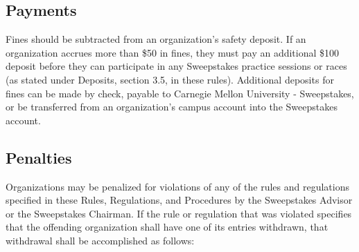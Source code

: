 \subsection{Payments}

	Fines should be subtracted from an organization's safety deposit. If an
	organization accrues more than \$50 in fines, they must pay an additional \$100
	deposit before they can participate in any Sweepstakes practice sessions or
	races (as stated under Deposits, section 3.5, in these rules). Additional
	deposits for fines can be made by check, payable to Carnegie Mellon University
	- Sweepstakes, or be transferred from an organization's campus account into the
	Sweepstakes account.

\subsection{Penalties}

	Organizations may be penalized for violations of any of the rules and
	regulations specified in these Rules, Regulations, and Procedures by the
	Sweepstakes Advisor or the Sweepstakes Chairman. If the rule or regulation that
	was violated specifies that the offending organization shall have one of its
	entries withdrawn, that withdrawal shall be accomplished as follows:


